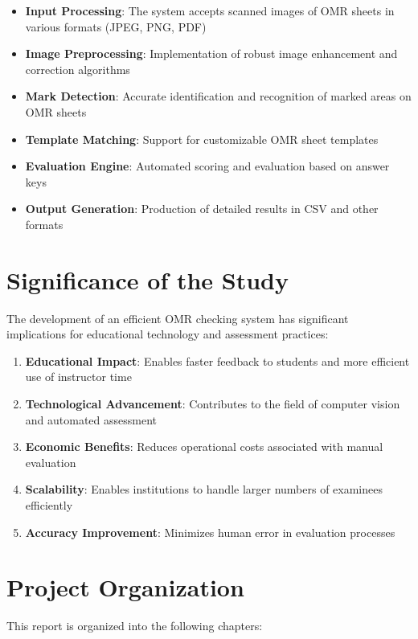 \begin{itemize}
\item \textbf{Input Processing}: The system accepts scanned images of OMR sheets in various formats (JPEG, PNG, PDF)
\item \textbf{Image Preprocessing}: Implementation of robust image enhancement and correction algorithms
\item \textbf{Mark Detection}: Accurate identification and recognition of marked areas on OMR sheets
\item \textbf{Template Matching}: Support for customizable OMR sheet templates
\item \textbf{Evaluation Engine}: Automated scoring and evaluation based on answer keys
\item \textbf{Output Generation}: Production of detailed results in CSV and other formats
\end{itemize}

\section{Significance of the Study}

The development of an efficient OMR checking system has significant implications for educational technology and assessment practices:

\begin{enumerate}
\item \textbf{Educational Impact}: Enables faster feedback to students and more efficient use of instructor time
\item \textbf{Technological Advancement}: Contributes to the field of computer vision and automated assessment
\item \textbf{Economic Benefits}: Reduces operational costs associated with manual evaluation
\item \textbf{Scalability}: Enables institutions to handle larger numbers of examinees efficiently
\item \textbf{Accuracy Improvement}: Minimizes human error in evaluation processes
\end{enumerate}

\section{Project Organization}

This report is organized into the following chapters:

